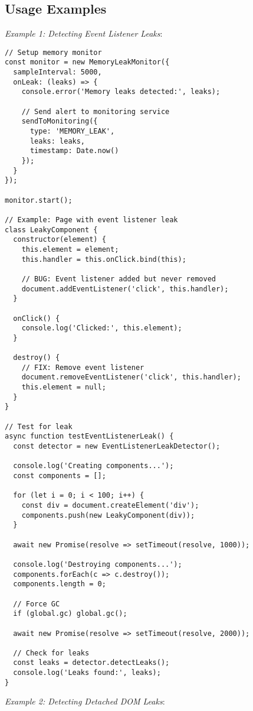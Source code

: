 \documentclass[11pt]{article}
\begin{document}
\subsection{Usage Examples}
\label{sec:org69b0120}

\emph{Example 1: Detecting Event Listener Leaks}:

\begin{verbatim}
// Setup memory monitor
const monitor = new MemoryLeakMonitor({
  sampleInterval: 5000,
  onLeak: (leaks) => {
    console.error('Memory leaks detected:', leaks);
    
    // Send alert to monitoring service
    sendToMonitoring({
      type: 'MEMORY_LEAK',
      leaks: leaks,
      timestamp: Date.now()
    });
  }
});

monitor.start();

// Example: Page with event listener leak
class LeakyComponent {
  constructor(element) {
    this.element = element;
    this.handler = this.onClick.bind(this);
    
    // BUG: Event listener added but never removed
    document.addEventListener('click', this.handler);
  }
  
  onClick() {
    console.log('Clicked:', this.element);
  }
  
  destroy() {
    // FIX: Remove event listener
    document.removeEventListener('click', this.handler);
    this.element = null;
  }
}

// Test for leak
async function testEventListenerLeak() {
  const detector = new EventListenerLeakDetector();
  
  console.log('Creating components...');
  const components = [];
  
  for (let i = 0; i < 100; i++) {
    const div = document.createElement('div');
    components.push(new LeakyComponent(div));
  }
  
  await new Promise(resolve => setTimeout(resolve, 1000));
  
  console.log('Destroying components...');
  components.forEach(c => c.destroy());
  components.length = 0;
  
  // Force GC
  if (global.gc) global.gc();
  
  await new Promise(resolve => setTimeout(resolve, 2000));
  
  // Check for leaks
  const leaks = detector.detectLeaks();
  console.log('Leaks found:', leaks);
}
\end{verbatim}

\emph{Example 2: Detecting Detached DOM Leaks}:
\end{document}
